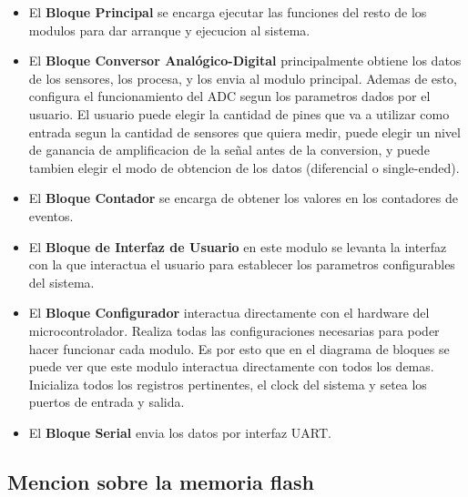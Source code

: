 \begin{itemize}
  \item El \textbf{Bloque Principal} se encarga ejecutar las funciones del resto de los modulos para dar arranque y ejecucion al sistema.
  \item El \textbf{Bloque Conversor Analógico-Digital} principalmente obtiene los datos de los sensores, los procesa, y los envia al modulo principal. Ademas de esto, configura el funcionamiento del ADC segun los parametros dados por el usuario. El usuario puede elegir la cantidad de pines que va a utilizar como entrada segun la cantidad de sensores que quiera medir, puede elegir un nivel de ganancia de amplificacion de la señal antes de la conversion, y puede tambien elegir el modo de obtencion de los datos (diferencial o single-ended).
  \item El \textbf{Bloque Contador} se encarga de obtener los valores en los contadores de eventos.
  \item El \textbf{Bloque de Interfaz de Usuario} en este modulo se levanta la interfaz con la que interactua el usuario para establecer los parametros configurables del sistema.
  \item El \textbf{Bloque Configurador} interactua directamente con el hardware del microcontrolador. Realiza todas las configuraciones necesarias para poder hacer funcionar cada modulo. Es por esto que en el diagrama de bloques se puede ver que este modulo interactua directamente con todos los demas. Inicializa todos los registros pertinentes, el clock del sistema y setea los puertos de entrada y salida.
  \item El \textbf{Bloque Serial} envia los datos por interfaz UART.
\end{itemize}

\subsection{Mencion sobre la memoria flash} %
\label{sub:mencion_sobre_la_memoria_flash}

